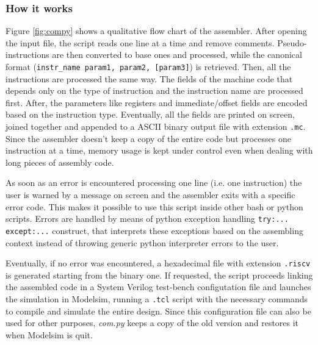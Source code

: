 \subsubsection{How it works}
Figure \ref{fig:compy} shows a qualitative flow chart of the assembler. After opening the input file, the script reads one line at a time and remove comments. Pseudo-instructions are then converted to base ones and processed, while the canonical format (\texttt{instr\_name param1, param2, [param3]}) is retrieved. Then, all the instructions are processed the same way. The fields of the machine code that depends only on the type of instruction and the instruction name are processed first. After, the parameters like registers and immediate/offset fields are encoded based on the instruction type. Eventually, all the fields are printed on screen, joined together and appended to a ASCII binary output file with extension \texttt{.mc}. Since the assembler doesn't keep a copy of the entire code but processes one instruction at a time, memory usage is kept under control even when dealing with long pieces of assembly code. 

As soon as an error is encountered processing one line (i.e. one instruction) the user is warned by a message on screen and the assembler exits with a specific error code. This makes it possible to use this script inside other bash or python scripts. Errors are handled by means of python exception handling \texttt{try:... except:...} construct, that interprets these exceptions based on the assembling context instead of throwing generic python interpreter errors to the user. 

Eventually, if no error was encountered, a hexadecimal file with extension \texttt{.riscv} is generated starting from the binary one. If requested, the script proceeds linking the assembled code in a System Verilog test-bench configutation file and launches the simulation in Modelsim, running a \texttt{.tcl} script with the necessary commands to compile and simulate the entire design. Since this configuration file can also be used for other purposes, \textit{com.py} keeps a copy of the old version and restores it when Modelsim is quit. 


